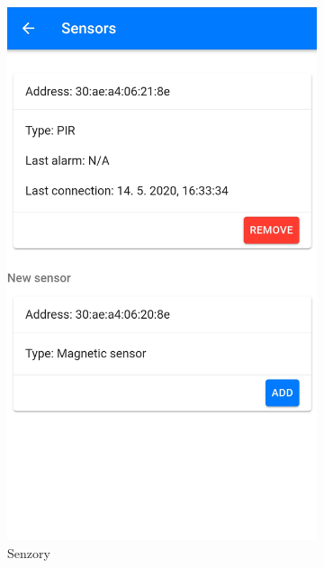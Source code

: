 \begin{figure}[!ht]
    \centering
    \begin{subfigure}{.4\textwidth}
      \centering
      \includegraphics[width=.8\linewidth]{obrazky-figures/screen_sensors.jpg}
      \caption{Senzory}
      \label{fig:screen_sensors}
    \end{subfigure}
    \begin{subfigure}{.4\textwidth}
      \centering

\end{subfigure}
\end{figure}

